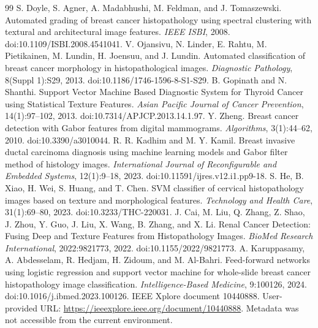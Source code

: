 \documentclass[9pt]{article}
\begin{document}
\begin{thebibliography}{99}
 S. Doyle, S. Agner, A. Madabhushi, M. Feldman, and J. Tomaszewski. Automated grading of breast cancer histopathology using spectral clustering with textural and architectural image features. \emph{IEEE ISBI}, 2008. doi:10.1109/ISBI.2008.4541041.
 V. Ojansivu, N. Linder, E. Rahtu, M. Pietikainen, M. Lundin, H. Joensuu, and J. Lundin. Automated classification of breast cancer morphology in histopathological images. \emph{Diagnostic Pathology}, 8(Suppl 1):S29, 2013. doi:10.1186/1746-1596-8-S1-S29.
 B. Gopinath and N. Shanthi. Support Vector Machine Based Diagnostic System for Thyroid Cancer using Statistical Texture Features. \emph{Asian Pacific Journal of Cancer Prevention}, 14(1):97--102, 2013. doi:10.7314/APJCP.2013.14.1.97.
 Y. Zheng. Breast cancer detection with Gabor features from digital mammograms. \emph{Algorithms}, 3(1):44--62, 2010. doi:10.3390/a3010044.
 R. R. Kadhim and M. Y. Kamil. Breast invasive ductal carcinoma diagnosis using machine learning models and Gabor filter method of histology images. \emph{International Journal of Reconfigurable and Embedded Systems}, 12(1):9--18, 2023. doi:10.11591/ijres.v12.i1.pp9-18.
 S. He, B. Xiao, H. Wei, S. Huang, and T. Chen. SVM classifier of cervical histopathology images based on texture and morphological features. \emph{Technology and Health Care}, 31(1):69--80, 2023. doi:10.3233/THC-220031.
 J. Cai, M. Liu, Q. Zhang, Z. Shao, J. Zhou, Y. Guo, J. Liu, X. Wang, B. Zhang, and X. Li. Renal Cancer Detection: Fusing Deep and Texture Features from Histopathology Images. \emph{BioMed Research International}, 2022:9821773, 2022. doi:10.1155/2022/9821773.
 A. Karuppasamy, A. Abdesselam, R. Hedjam, H. Zidoum, and M. Al-Bahri. Feed-forward networks using logistic regression and support vector machine for whole-slide breast cancer histopathology image classification. \emph{Intelligence-Based Medicine}, 9:100126, 2024. doi:10.1016/j.ibmed.2023.100126.
 IEEE Xplore document 10440888. User-provided URL: \url{https://ieeexplore.ieee.org/document/10440888}. Metadata was not accessible from the current environment.
\end{thebibliography}
\end{document}
